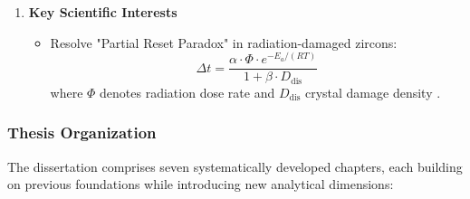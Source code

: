 \documentclass{article}
\begin{document}
\begin{enumerate}
    \item \textbf{Key Scientific Interests}
    \begin{itemize}
        \item Resolve "Partial Reset Paradox" in radiation-damaged zircons:
        \begin{equation}
            \Delta t = \frac{\alpha \cdot \Phi \cdot e^{-E_a/(RT)}}{1 + \beta \cdot D_{\text{dis}}}
            \label{eq:reset}
        \end{equation}
        where $\Phi$ denotes radiation dose rate and $D_{\text{dis}}$ crystal damage density \cite{Nasdala2001}.
    \end{itemize}
\end{enumerate}

\subsubsection*{Thesis Organization}
The dissertation comprises seven systematically developed chapters, each building on previous foundations while introducing new analytical dimensions:
\end{document}
